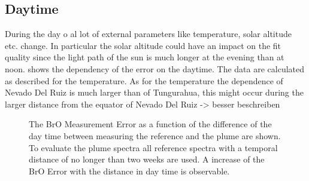 \documentclass  [
  paper    = a4,
  BCOR     = 10mm,
  twoside,
  fontsize = 12pt,
  fleqn,
  toc      = bibnumbered,
  toc      = listofnumbered,
  numbers  = noendperiod,
  headings = normal,
  listof   = leveldown,
  version  = 3.03
]                                       {scrreprt}
\begin{document}
	\subsection{Daytime}
	During the day o al lot of external parameters like temperature, solar altitude etc. change. In particular the solar altitude could have an impact on the fit quality since the light path of the sun is much longer at the evening than at noon.  shows the dependency of the  error on the daytime. The data are calculated as described for the temperature. As for the temperature the dependence of Nevado Del Ruiz is much larger than of Tungurahua, this might occur during the larger distance from the equator of Nevado Del Ruiz -> besser beschreiben

	\begin{figure}[h!]			
		
		\caption{The BrO Measurement Error as a function of the difference of the day time between measuring the reference and the plume are shown. To evaluate the plume spectra all reference spectra with a temporal distance of no longer than two weeks are used. A increase of the BrO Error with the distance in day time is observable.}
		\label{fig:diffdaytime}
	\end{figure}
\end{document}
